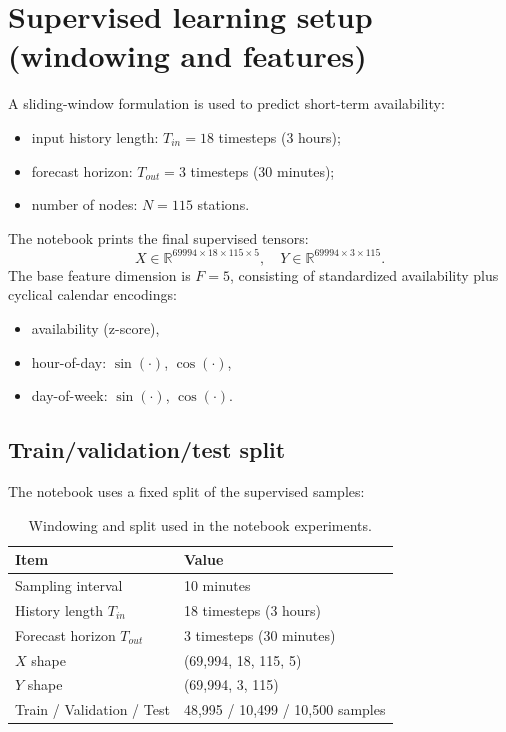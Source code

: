 \documentclass[11pt]{report}
\begin{document}
\section{Supervised learning setup (windowing and features)}
A sliding-window formulation is used to predict short-term availability:
\begin{itemize}
    \item input history length: $T_{in}=18$ timesteps (3 hours);
    \item forecast horizon: $T_{out}=3$ timesteps (30 minutes);
    \item number of nodes: $N=115$ stations.
\end{itemize}

The notebook prints the final supervised tensors:
\[
X \in \mathbb{R}^{69994 \times 18 \times 115 \times 5}, \quad
Y \in \mathbb{R}^{69994 \times 3 \times 115}.
\]
The base feature dimension is $F=5$, consisting of standardized availability plus cyclical calendar encodings:
\begin{itemize}
    \item availability (z-score),
    \item hour-of-day: $\sin(\cdot)$, $\cos(\cdot)$,
    \item day-of-week: $\sin(\cdot)$, $\cos(\cdot)$.
\end{itemize}

\subsection{Train/validation/test split}
The notebook uses a fixed split of the supervised samples:

\begin{table}[!htbp]
\centering
\small
\caption{Windowing and split used in the notebook experiments.}
\label{tab:app_window_split}
\renewcommand{\arraystretch}{1.15}
\begin{tabular}{ll}
\hline
\textbf{Item} & \textbf{Value} \\
\hline
Sampling interval & 10 minutes \\
History length $T_{in}$ & 18 timesteps (3 hours) \\
Forecast horizon $T_{out}$ & 3 timesteps (30 minutes) \\
$X$ shape & (69,994, 18, 115, 5) \\
$Y$ shape & (69,994, 3, 115) \\
Train / Validation / Test & 48,995 / 10,499 / 10,500 samples \\
\hline
\end{tabular}
\end{table}
\end{document}
